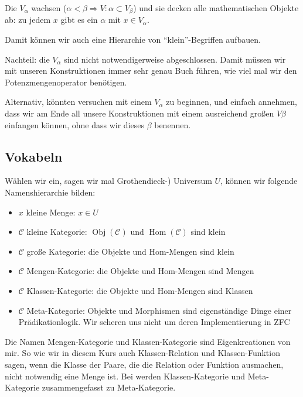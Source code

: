\documentclass[a4paper]{amsart}
\theoremstyle{definition}
\DeclareMathOperator{\Hom}{Hom}
\newcommand{\CC}{\ensuremath{\mathcal{ C }}}
\begin{document}
Die $V_\alpha$ wachsen ($\alpha < \beta \Rightarrow V:\alpha \subset V_\beta$) und sie decken alle mathematischen Objekte ab: zu jedem $x$ gibt es ein $\alpha$ mit $x \in V_\alpha$.

Damit können wir auch eine Hierarchie von "`klein"'-Begriffen aufbauen.

Nachteil: die $V_\alpha$ sind nicht notwendigerweise abgeschlossen. Damit müssen wir mit unseren Konstruktionen immer sehr genau Buch führen, wie viel mal wir den Potenzmengenoperator benötigen.

Alternativ, könnten versuchen mit einem $V_\alpha$ zu beginnen, und einfach annehmen, dass wir am Ende all unsere Konstruktionen mit einem ausreichend großen $V\beta$ einfangen können, ohne dass wir dieses $\beta$ benennen.

\subsection{Vokabeln}
Wählen wir ein, sagen wir mal Grothendieck-) Universum $U$, können wir folgende Namenshierarchie bilden:
\begin{itemize}
   \item $x$ kleine Menge: $x \in U$
   \item $\CC$ kleine Kategorie: $\operatorname{Obj}(\CC)$ und $\Hom(\CC)$ sind klein
   \item $\CC$ große Kategorie: die Objekte und Hom-Mengen sind klein
   \item $\CC$ Mengen-Kategorie: die Objekte und Hom-Mengen sind Mengen 
   \item $\CC$ Klassen-Kategorie: die Objekte und Hom-Mengen sind Klassen
   \item $\CC$ Meta-Kategorie: Objekte und Morphismen sind eigenständige Dinge einer Prädikationlogik. Wir scheren uns nicht um deren Implementierung in ZFC
\end{itemize}
Die Namen Mengen-Kategorie und Klassen-Kategorie sind Eigenkreationen von mir. So wie wir in diesem Kurs auch Klassen-Relation und Klassen-Funktion sagen, wenn die Klasse der Paare, die die Relation oder Funktion ausmachen, nicht notwendig eine Menge ist. Bei \cite{MacLane} werden Klassen-Kategorie und Meta-Kategorie zusammengefasst zu Meta-Kategorie.

\end{document}
